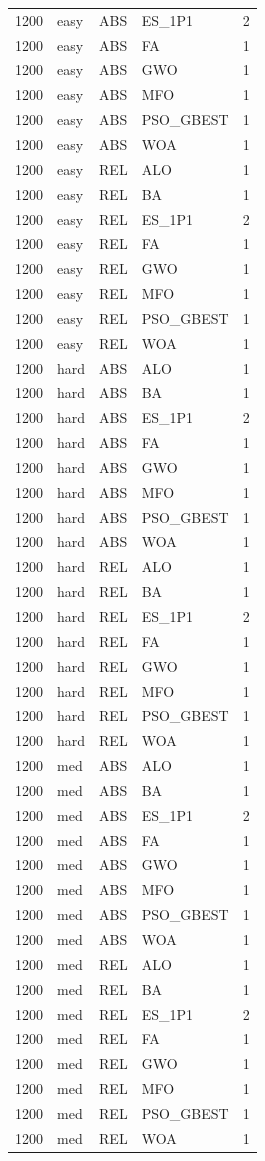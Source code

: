 \begin{tabular}{r l l l l}
1200 & easy & ABS & ES_1P1 & 2 \\
1200 & easy & ABS & FA & 1 \\
1200 & easy & ABS & GWO & 1 \\
1200 & easy & ABS & MFO & 1 \\
1200 & easy & ABS & PSO_GBEST & 1 \\
1200 & easy & ABS & WOA & 1 \\
1200 & easy & REL & ALO & 1 \\
1200 & easy & REL & BA & 1 \\
1200 & easy & REL & ES_1P1 & 2 \\
1200 & easy & REL & FA & 1 \\
1200 & easy & REL & GWO & 1 \\
1200 & easy & REL & MFO & 1 \\
1200 & easy & REL & PSO_GBEST & 1 \\
1200 & easy & REL & WOA & 1 \\
1200 & hard & ABS & ALO & 1 \\
1200 & hard & ABS & BA & 1 \\
1200 & hard & ABS & ES_1P1 & 2 \\
1200 & hard & ABS & FA & 1 \\
1200 & hard & ABS & GWO & 1 \\
1200 & hard & ABS & MFO & 1 \\
1200 & hard & ABS & PSO_GBEST & 1 \\
1200 & hard & ABS & WOA & 1 \\
1200 & hard & REL & ALO & 1 \\
1200 & hard & REL & BA & 1 \\
1200 & hard & REL & ES_1P1 & 2 \\
1200 & hard & REL & FA & 1 \\
1200 & hard & REL & GWO & 1 \\
1200 & hard & REL & MFO & 1 \\
1200 & hard & REL & PSO_GBEST & 1 \\
1200 & hard & REL & WOA & 1 \\
1200 & med & ABS & ALO & 1 \\
1200 & med & ABS & BA & 1 \\
1200 & med & ABS & ES_1P1 & 2 \\
1200 & med & ABS & FA & 1 \\
1200 & med & ABS & GWO & 1 \\
1200 & med & ABS & MFO & 1 \\
1200 & med & ABS & PSO_GBEST & 1 \\
1200 & med & ABS & WOA & 1 \\
1200 & med & REL & ALO & 1 \\
1200 & med & REL & BA & 1 \\
1200 & med & REL & ES_1P1 & 2 \\
1200 & med & REL & FA & 1 \\
1200 & med & REL & GWO & 1 \\
1200 & med & REL & MFO & 1 \\
1200 & med & REL & PSO_GBEST & 1 \\
1200 & med & REL & WOA & 1 \\
\hline
\end{tabular}
